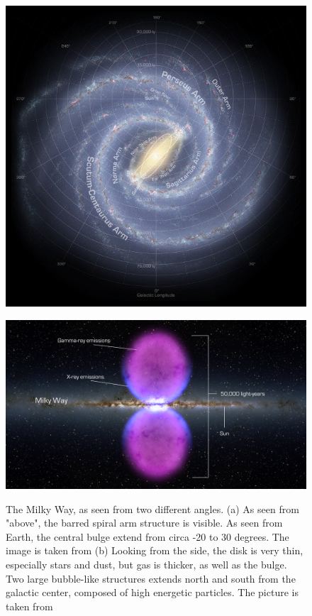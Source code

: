 \begin{figure}[h]
  \centering
  \begin{minipage}[h]{0.39\textwidth}
  	\centering
	\includegraphics[width=1.\linewidth]{pic/theory/top_galaxy_map.jpg}
  	\subcaption{}
  	\label{fig:top_gal_map}
  \end{minipage}
  \hfill
  \begin{minipage}[h]{0.59\textwidth}
	  \centering
	  \includegraphics[width=1.\linewidth]{pic/theory/Fermi_bubble.jpg}
	  \subcaption{}
	  \label{fig:fermi_bubbles}
  \end{minipage}
  \caption[The milky Way from different angles.]{The Milky Way, as seen from two different angles. (a) As seen from "above", the barred spiral arm structure is visible. As seen from Earth, the central bulge extend from circa -20 to 30 degrees. The image is taken from \cite{GalMap} (b) Looking from the side, the disk is very thin, especially stars and dust, but gas is thicker, as well as the bulge. Two large bubble-like structures extends north and south from the galactic center, composed of high energetic particles. The picture is taken from \cite{GSFPFermi_bubbles}}
  \label{fig:Galaxy_maps} 
\end{figure}

